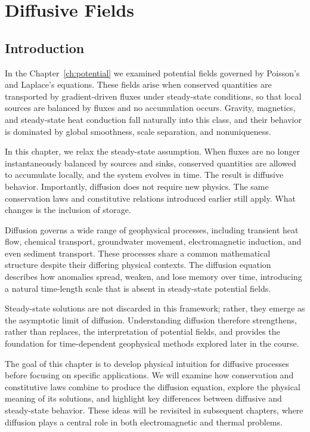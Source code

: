 \chapter{Diffusive Fields}\label{ch:diffusion}

\section{Introduction}

In the Chapter~\ref{ch:potential} we examined potential fields governed by Poisson's and Laplace's equations. These fields arise when conserved quantities are transported by gradient-driven fluxes under steady-state conditions, so that local sources are balanced by fluxes and no accumulation occurs. Gravity, magnetics, and steady-state heat conduction fall naturally into this class, and their behavior is dominated by global smoothness, scale separation, and nonuniqueness.

In this chapter, we relax the steady-state assumption. When fluxes are no longer instantaneously balanced by sources and sinks, conserved quantities are allowed to accumulate locally, and the system evolves in time. The result is diffusive behavior. Importantly, diffusion does not require new physics. The same conservation laws and constitutive relations introduced earlier still apply. What changes is the inclusion of storage.

Diffusion governs a wide range of geophysical processes, including transient heat flow, chemical transport, groundwater movement, electromagnetic induction, and even sediment transport.  These processes share a common mathematical structure despite their differing physical contexts. The diffusion equation describes how anomalies spread, weaken, and lose memory over time, introducing a natural time-length scale that is absent in steady-state potential fields.

Steady-state solutions are not discarded in this framework; rather, they emerge as the asymptotic limit of diffusion. Understanding diffusion therefore strengthens, rather than replaces, the interpretation of potential fields, and provides the foundation for time-dependent geophysical methods explored later in the course.

The goal of this chapter is to develop physical intuition for diffusive processes before focusing on specific applications. We will examine how conservation and constitutive laws combine to produce the diffusion equation, explore the physical meaning of its solutions, and highlight key differences between diffusive and steady-state behavior. These ideas will be revisited in subsequent chapters, where diffusion plays a central role in both electromagnetic and thermal problems.

